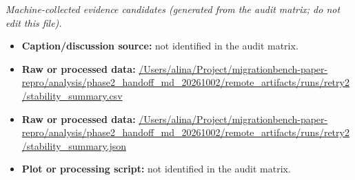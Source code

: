 \emph{Machine-collected evidence candidates (generated from the audit matrix; do not edit this file).}
\begin{itemize}[leftmargin=1.4em,noitemsep]
\item \textbf{Caption/discussion source:} not identified in the audit matrix.
\item \textbf{Raw or processed data:} \url{/Users/alina/Project/migrationbench-paper-repro/analysis/phase2_handoff_md_20261002/remote_artifacts/runs/retry2/stability_summary.csv}
\item \textbf{Raw or processed data:} \url{/Users/alina/Project/migrationbench-paper-repro/analysis/phase2_handoff_md_20261002/remote_artifacts/runs/retry2/stability_summary.json}
\item \textbf{Plot or processing script:} not identified in the audit matrix.
\end{itemize}
